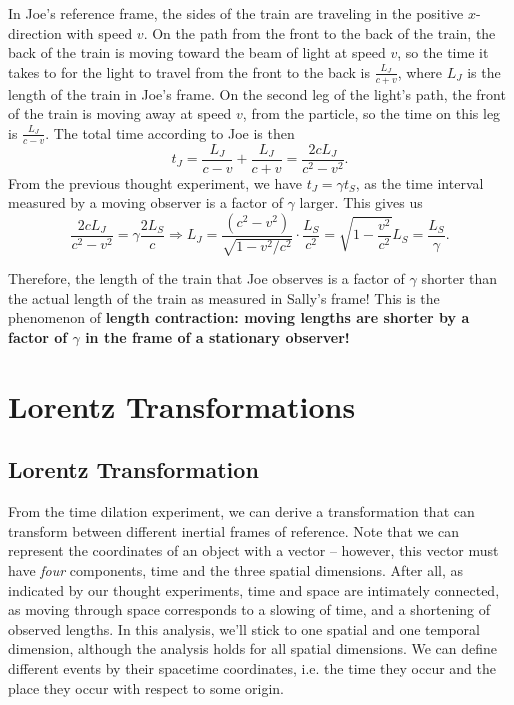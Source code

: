 \documentclass[12pt]{scrartcl}
\begin{document}
In Joe's reference frame, the sides of the train are traveling in the positive $x$-direction with speed $v$. On the path from the front to the back of the train, the back of the train is moving toward the beam of light at speed $v$, so the time it takes to for the light to travel from the front to the back is $\frac{L_J}{c+v}$, where $L_J$ is the length of the train in Joe's frame. On the second leg of the light's path, the front of the train is moving away at speed $v$, from the particle, so the time on this leg is $\frac{L_J}{c-v}$. The total time according to Joe is then
\[
	t_J = \frac{L_J}{c-v} + \frac{L_J}{c+v} = \frac{2cL_J}{c^2-v^2}.
\]
From the previous thought experiment, we have $t_J = \gamma t_S$, as the time interval measured by a moving observer is a factor of $\gamma$ larger. This gives us
\[ \frac{2cL_J}{c^2-v^2} = \gamma \frac{2 L_S}{c} \Rightarrow L_J =  \frac{(c^2-v^2)}{\sqrt{1-v^2/c^2}} \cdot \frac{L_S}{c^2} = \sqrt{1-\frac{v^2}{c^2}} L_S = \frac{L_S}{\gamma} .\]

Therefore, the length of the train that Joe observes is a factor of $\gamma$ shorter than the actual length of the train as measured in Sally's frame! This is the phenomenon of \textbf{length contraction: moving lengths are shorter by a factor of $\gamma$ in the frame of a stationary observer!}

\section{Lorentz Transformations}
\subsection*{Lorentz Transformation}
From the time dilation experiment, we can derive a transformation that can transform between different inertial frames of reference. Note that we can represent the coordinates of an object with a vector -- however, this vector must have \textit{four} components, time and the three spatial dimensions. After all, as indicated by our thought experiments, time and space are intimately connected, as moving through space corresponds to a slowing of time, and a shortening of observed lengths. In this analysis, we'll stick to one spatial and one temporal dimension, although the analysis holds for all spatial dimensions. We can define different events by their spacetime coordinates, i.e. the time they occur and the place they occur with respect to some origin.
\end{document}
